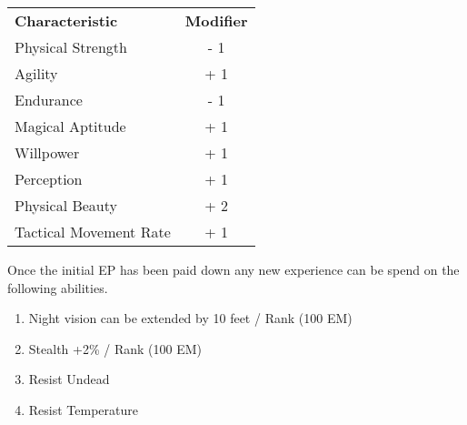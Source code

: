 \documentclass[a4paper]{article}
\begin{document}
\begin{multicols*}{3}
\begin{tabularx}{\linewidth}{Xc}
\textbf{Characteristic} & \textbf{Modifier} \\
Physical Strength	& - 1 \\
Agility			& + 1 \\
Endurance		& - 1 \\
Magical Aptitude	& + 1 \\
Willpower		& + 1 \\
Perception		& + 1 \\
Physical Beauty		& + 2 \\
Tactical Movement Rate	& + 1 \\
\end{tabularx}

Once the initial EP has been paid down any new experience can be spend
on the following abilities.

\begin{enumerate}
\item
Night vision can be extended by 10 feet / Rank (100 EM)

\item
Stealth +2\% / Rank (100 EM)

\item
\begin{talent}{Resist Undead}
\begin{effects}
\end{effects}
\end{talent}

\item
\begin{talent}{Resist Temperature}


\end{talent}
\end{enumerate}
\end{multicols*}
\end{document}
